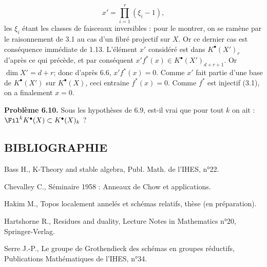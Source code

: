 
\[
  x'=\prod_{i=1}^{r}(\xi_i-1),
\]
les $\xi_i$
étant les classes de faisceaux inversibles : pour le montrer, on se ramène par le raisonnement de 3.1 au cas d'un fibré projectif sur $X$. Or ce dernier cas est conséquence immédiate de 1.13. L'élément $x'$ considéré est dans $K^{\bullet}(X')_r$ d'après ce qui précède, et par conséquent $x'f^*(x)\in K^{\bullet}(X')_{d+r+1}$. Or $\dim X'=d+r$; donc d'après 6.6, $x'f^*(x)=0$. Comme $x'$ fait partie d'une base de $K^{\bullet}(X')$ sur $K^{\bullet}(X)$, ceci entraine $f^*(x)=0$. Comme $f^*$ est injectif (3.1), on a finalement $x=0$.

\textbf{Problème 6.10.} Sous les hypothèses de 6.9, est-il vrai que pour tout $k$ on ait : $\Fil^kK^{\bullet}(X)\subset K^{\bullet}(X)_k$ ?

\subsection*{BIBLIOGRAPHIE}
\begin{enumerate}[label={\textup{[\arabic*]}}]
\item Bass H., K-Theory and stable algebra, Publ. Math. de l'IHES, n°22.
\item Chevalley C., Séminaire 1958 : Anneaux de Chow et applications.
\item Hakim M., Topos localement annelés et schémas relatifs, thèse (en préparation).
\item Hartshorne R., Residues and duality, Lecture Notes in Mathematics n°20, Springer-Verlag.
\item Serre J.-P., Le groupe de Grothendieck des schémas en groupes réductifs, Publications Mathématiques de l'IHES, n°34.
\end{enumerate}



\providecommand{\Kosz}{\mathrm K}
\providecommand{\Proj}{\operatorname{Proj}}
\providecommand{\Sym}{\operatorname{Sym}}
\providecommand{\gr}{\operatorname{gr}}
\providecommand{\Tor}{\operatorname{Tor}}
\providecommand{\Spec}{\operatorname{Spec}}
\providecommand{\Imf}{\operatorname{Im}}
\providecommand{\Ker}{\operatorname{Ker}}
\providecommand{\Id}{\operatorname{Id}}
\providecommand{\rad}{\operatorname{rad}}
\providecommand{\cO}{\mathcal O}
\providecommand{\cS}{\mathcal S}
\providecommand{\cJ}{\mathcal J}
\providecommand{\cN}{\mathcal N}
\providecommand{\bfP}{\mathbf P}
\providecommand{\bfA}{\mathbf A}


